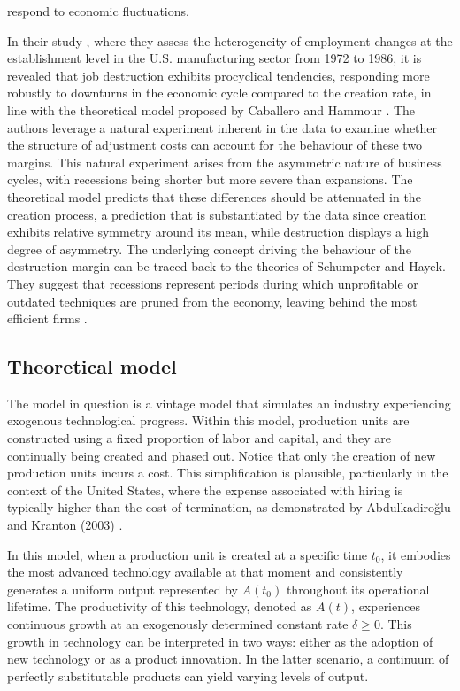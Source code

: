 \documentclass[12pt]{article}
\begin{document}
respond to economic fluctuations.
\par
In their study \cite{DavHalt92}, where they assess the heterogeneity of employment changes at the establishment level in
the U.S. manufacturing sector from 1972 to 1986, it is revealed that job destruction exhibits procyclical tendencies,
responding more robustly to downturns in the economic cycle compared to the creation rate, in line with the theoretical
model proposed by Caballero and Hammour \cite{CabHarm94}. The authors leverage a natural experiment inherent in the data
to examine whether the structure of adjustment costs can account for the behaviour of these two margins. This natural
experiment arises from the asymmetric nature of business cycles, with recessions being shorter but more severe than
expansions. The theoretical model predicts that these differences should be attenuated in the creation process, a
prediction that is substantiated by the data since creation exhibits relative symmetry around its mean, while
destruction displays a high degree of asymmetry.
The underlying concept driving the behaviour of the destruction margin can be traced back to the theories of Schumpeter
and Hayek.  They suggest that recessions represent periods during which unprofitable or outdated techniques are pruned
from the economy, leaving behind the most efficient firms \citet{HaCa07}.
\subsection{Theoretical model}
The model in question is a vintage model that simulates an industry experiencing exogenous technological progress.
Within this model, production units are constructed using a fixed proportion of labor and capital, and they are
continually being created and phased out. Notice that only the creation of new production units
incurs a cost. This simplification is plausible, particularly in the context of the United States, where the expense
associated with hiring is typically higher than the cost of termination, as demonstrated by Abdulkadiroğlu and Kranton
(2003) \cite{AbdKra03}. 
\par
In this model, when a production unit is created at a specific time \(t_0\), it embodies the most advanced technology
available at that moment and consistently generates a uniform output represented by \(A(t_0)\) throughout its
operational lifetime. The productivity of this technology, denoted as \(A(t)\), experiences continuous growth at an
exogenously determined constant rate \(\delta \ge 0 \). This growth in technology can be interpreted in two ways: either
as the adoption of new technology or as a product innovation. In the latter scenario, a continuum of perfectly
substitutable products can yield varying levels of output.
\end{document}

